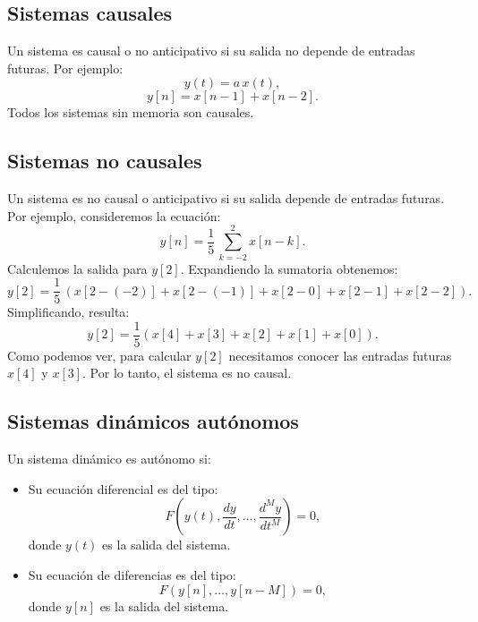 \documentclass[11pt,a4paper,openany]{book}
\begin{document}
\subsection{Sistemas causales}
Un sistema es causal o no anticipativo si su salida no depende de entradas futuras. Por ejemplo:
\begin{equation}
	y(t) = a \, x(t),
\end{equation}
\begin{equation}
	y[n] = x[n-1] + x[n-2].
\end{equation}
Todos los sistemas sin memoria son causales.

\subsection{Sistemas no causales}
Un sistema es no causal o anticipativo si su salida depende de entradas futuras. Por ejemplo, consideremos la ecuación:
\begin{equation}
	y[n] = \frac{1}{5} \, \sum_{k=-2}^{2}x[n-k].
\end{equation}
Calculemos la salida para $y[2]$. Expandiendo la sumatoria obtenemos:
\begin{equation}
	y[2] = \frac{1}{5} \, \left( x[2-(-2)] + x[2-(-1)] + x[2-0] + x[2-1] + x[2-2] \right).
\end{equation}
Simplificando, resulta:
\begin{equation}
	y[2] = \frac{1}{5} \left( x[4] + x[3] + x[2] + x[1] + x[0] \right).
\end{equation}
Como podemos ver, para calcular $y[2]$ necesitamos conocer las entradas futuras $x[4]$ y $x[3]$. Por lo tanto, el sistema es no causal.
	
\subsection{Sistemas dinámicos autónomos}
Un sistema dinámico es autónomo si:
\begin{itemize}
	\item Su ecuación diferencial es del tipo:
	\begin{equation}
		F\left(y(t), \frac{dy}{dt}, \dots, \frac{d^{M}y}{dt^{M}}\right) = 0,                  
	\end{equation}
	donde $y(t)$ es la salida del sistema.
	\item Su ecuación de diferencias es del tipo:
	\begin{equation}
		F(y[n], \dots, y[n-M]) = 0, 
	\end{equation}
	donde $y[n]$ es la salida del sistema.
\end{itemize}
\end{document}
